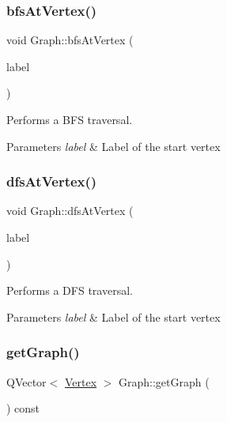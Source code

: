 \subsubsection{\texorpdfstring{bfs\+At\+Vertex()}{bfsAtVertex()}}
{\footnotesize\ttfamily void Graph\+::bfs\+At\+Vertex (\begin{DoxyParamCaption}\item[{Q\+String}]{label }\end{DoxyParamCaption})}



Performs a B\+FS traversal. 


\begin{DoxyParams}{Parameters}
{\em label} & Label of the start vertex \\
\hline
\end{DoxyParams}
\mbox{\label{class_graph_a2a65cf186c6fb2b2cc729c5912f64c72}} 
\subsubsection{\texorpdfstring{dfs\+At\+Vertex()}{dfsAtVertex()}}
{\footnotesize\ttfamily void Graph\+::dfs\+At\+Vertex (\begin{DoxyParamCaption}\item[{Q\+String}]{label }\end{DoxyParamCaption})}



Performs a D\+FS traversal. 


\begin{DoxyParams}{Parameters}
{\em label} & Label of the start vertex \\
\hline
\end{DoxyParams}
\mbox{\label{class_graph_a803afabcf8fd3f7ede5f547f1b61cccf}} 
\subsubsection{\texorpdfstring{get\+Graph()}{getGraph()}}
{\footnotesize\ttfamily Q\+Vector$<$ \hyperlink{struct_vertex}{Vertex} $>$ Graph\+::get\+Graph (\begin{DoxyParamCaption}{ }\end{DoxyParamCaption}) const}



